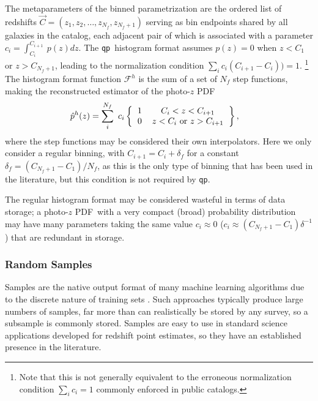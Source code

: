 \documentclass[\docopts]{\docclass}
\newcommand{\qp}{\texttt{qp}}
\newcommand{\pz}{photo-$z$ PDF}
\begin{document}
The metaparameters of the binned parametrization are the ordered list of 
redshifts $\vec{C} = (z_{1}, z_{2}, \dots, z_{N_{f}}, z_{N_{f}+1})$ serving as 
bin endpoints shared by all galaxies in the catalog, each adjacent pair of 
which is associated with a parameter $c_{i}=\int_{C_{i}}^{C_{i+1}}\ p(z)dz$.
The \qp\ histogram format assumes $p(z)=0$ when $z<C_{1}$ or $z>C_{N_{f}+1}$, 
leading to the normalization condition $\sum_{i} c_{i}(C_{i+1}-C_{i})) = 1$.
\footnote{Note that this is not generally equivalent to the erroneous 
normalization condition $\sum_{i} c_{i} = 1$ commonly enforced in public 
catalogs.}
The histogram format function $\mathcal{F}^{h}$ is the sum of a set of $N_{f}$ 
step functions, making the reconstructed estimator of the \pz
\begin{align}
  \label{eq:binned}
  \hat{p}^{h}(z) &= \sum_{i}^{N_{f}}\ c_{i} 
\left\{\begin{tabular}{cc}$1$&$C_{i}<z<C_{i+1}$\\
0&$z < C_{i}$\ or\ $z > C_{i+1}$\end{tabular}\right\},
\end{align}
where the step functions may be considered their own interpolators.
Here we only consider a regular binning, with $C_{i+1}=C_{i}+\delta_{f}$ for a 
constant $\delta_{f}=(C_{N_{f}+1}-C_{1})/N_{f}$, as this is the only type of 
binning that has been used in the literature, but this condition is not 
required by \qp.

The regular histogram format may be considered wasteful in terms of data 
storage; a \pz\ with a very compact (broad) probability distribution may have 
many parameters taking the same value $c_{i}\approx0$ 
($c_{i}\approx(C_{N_{f}+1}-C_{1})\delta^{-1}$) that are redundant in storage.

\subsubsection{Random Samples}
\label{sec:samples}

Samples are the native output format of many machine learning algorithms due to 
the discrete nature of training sets \citep{de_vicente_dnf_2016}.
Such approaches typically produce large numbers of samples, far more than can 
realistically be stored by any survey, so a subsample is commonly stored.
Samples are easy to use in standard science applications developed for redshift 
point estimates, so they have an established presence in the literature.
\end{document}
